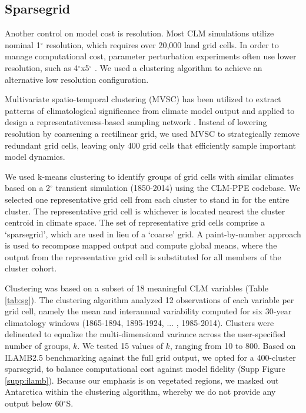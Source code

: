 \documentclass[draft]{agujournal2019}
\begin{document}
\subsection{Sparsegrid}
\label{sect:sg}
Another control on model cost is resolution. Most CLM simulations utilize nominal 1$^\circ$ resolution, which requires over 20,000 land grid cells. In order to manage computational cost, parameter perturbation experiments often use lower resolution, such as 4$^\circ$x5$^\circ$ \cite{dagon2020}. We used a clustering algorithm to achieve an alternative low resolution configuration.

Multivariate spatio-temporal clustering (MVSC) has been utilized to extract patterns of climatological significance from climate model output \cite{hoffman2005} and applied to design a representativeness-based sampling network \cite{hoffman2013}. Instead of lowering resolution by coarsening a rectilinear grid, we used MVSC to strategically remove redundant grid cells, leaving only 400 grid cells that efficiently sample important model dynamics.

We used k-means clustering to identify groups of grid cells with similar climates based on a 2$^\circ$ transient simulation (1850-2014) using the CLM-PPE codebase. We selected one representative grid cell from each cluster to stand in for the entire cluster. The representative grid cell is whichever is located nearest the cluster centroid in climate space. The set of representative grid cells comprise a `sparsegrid', which are used in lieu of a `coarse' grid. A paint-by-number approach is used to recompose mapped output and compute global means, where the output from the representative grid cell is substituted for all members of the cluster cohort.

Clustering was based on a subset of 18 meaningful CLM variables (Table \ref{tab:sg}). The clustering algorithm analyzed 12 observations of each variable per grid cell, namely the mean and interannual variability computed for six 30-year climatology windows (1865-1894, 1895-1924, ... , 1985-2014). Clusters were delineated to equalize the multi-dimensional variance across the user-specified number of groups, $k$. We tested 15 values of $k$, ranging from 10 to 800. Based on ILAMB2.5 benchmarking \cite{collier2018} against the full grid output, we opted for a 400-cluster sparsegrid, to balance computational cost against model fidelity (Supp Figure \ref{supp:ilamb}). Because our emphasis is on vegetated regions, we masked out Antarctica within the clustering algorithm, whereby we do not provide any output below 60$^\circ$S.
\end{document}
